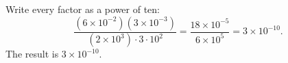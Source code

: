 Write every factor as a power of ten:
\[
\dfrac{(6\times10^{-2})(3\times10^{-3})}{(2\times10^{3})\cdot3\cdot10^{2}}=\dfrac{18\times10^{-5}}{6\times10^{5}}=3\times10^{-10}.
\]
The result is $\boxed{3\times10^{-10}}$.
